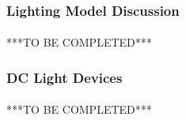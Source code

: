 \subsubsection{Lighting Model Discussion}

\paragraph{}
***TO BE COMPLETED***


\subsubsection{DC Light Devices}

\paragraph{}
***TO BE COMPLETED***

